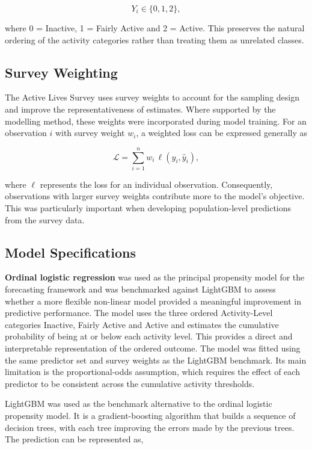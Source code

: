 \documentclass[ %
                    author={Ashrey Ashrey, Sanya Kapoor, Trisha Sharma, Yash Bhooshan Pandloskar},
                supervisor={Dr. Dalila O’Grady},
                    degree={MSc},
                     title={Using machine learning to forecast physical activity participation, volunteering and activity patterns in London},
                  subtitle={},
                      type={},
                      year={2021}]{dissertation}
\begin{document}
\[
Y_i \in \{0,1,2\},
\]

where 0 = Inactive, 1 = Fairly Active and 2 = Active. This preserves the natural ordering of the activity categories rather than treating them as unrelated classes.

\FloatBarrier
\subsection{Survey Weighting}

\noindent
The Active Lives Survey uses survey weights to account for the sampling design and improve the representativeness of estimates. Where supported by the modelling method, these weights were incorporated during model training. For an observation \(i\) with survey weight \(w_i\), a weighted loss can be expressed generally as

\[
\mathcal{L} = \sum_{i=1}^{n} w_i \,\ell(y_i,\widehat{y}_i),
\]

where \(\ell\) represents the loss for an individual observation. Consequently, observations with larger survey weights contribute more to the model's objective. This was particularly important when developing population-level predictions from the survey data.

\FloatBarrier
\subsection{Model Specifications}

\noindent
\textbf{Ordinal logistic regression} was used as the principal propensity model for
the forecasting framework and was benchmarked against LightGBM to assess
whether a more flexible non-linear model provided a meaningful improvement
in predictive performance. The model uses the three ordered Activity-Level
categories Inactive, Fairly Active and Active and estimates the cumulative
probability of being at or below each activity level. This provides a direct
and interpretable representation of the ordered outcome. The model was fitted
using the same predictor set and survey weights as the LightGBM benchmark.
Its main limitation is the proportional-odds assumption, which requires the
effect of each predictor to be consistent across the cumulative activity
thresholds.

LightGBM was used as the benchmark alternative to the ordinal logistic
propensity model. It is a gradient-boosting algorithm that builds a sequence
of decision trees, with each tree improving the errors made by the previous
trees. The prediction can be represented as,
\end{document}
